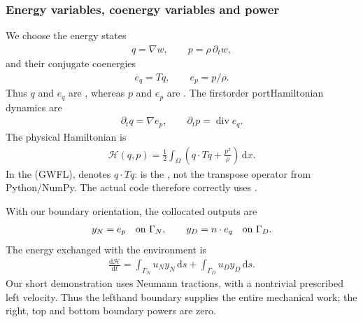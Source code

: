 \documentclass[letterpaper,10pt,english]{sphinxmanual}
\begin{document}
\subsubsection{Energy variables, co\sphinxhyphen{}energy variables and power}
\label{\detokenize{examples/wave:energy-variables-co-energy-variables-and-power}}
\sphinxAtStartPar
We choose the energy states
\begin{equation*}
\begin{split}q=\nabla w,\qquad p=\rho\,\partial_t w,\end{split}
\end{equation*}
\sphinxAtStartPar
and their conjugate co\sphinxhyphen{}energies
\begin{equation*}
\begin{split}e_q=Tq,\qquad e_p=p/\rho.\end{split}
\end{equation*}
\sphinxAtStartPar
Thus \(q\) and \(e_q\) are ,
whereas \(p\) and \(e_p\) are . The
first\sphinxhyphen{}order port\sphinxhyphen{}Hamiltonian dynamics are
\begin{equation*}
\begin{split}\partial_t q=\nabla e_p,\qquad
\partial_t p=\operatorname{div}e_q.\end{split}
\end{equation*}
\sphinxAtStartPar
The physical Hamiltonian is
\begin{equation}\label{equation:examples/wave:wave_2d_conservative_energy}
\begin{split}\mathcal H(q,p)=\tfrac12\int_{\Omega}
\left(q\cdot Tq+\frac{p^2}{\rho}\right)\,\mathrm dx.\end{split}
\end{equation}
\sphinxAtStartPar
In the  (GWFL),
 denotes \(q\cdot Tq\):  is the
, not the transpose
operator from Python/NumPy. The actual code therefore
correctly uses .

\sphinxAtStartPar
With our boundary orientation, the collocated outputs are
\begin{equation*}
\begin{split}y_N=e_p \quad\hbox{on }\Gamma_N,\qquad
y_D=n\cdot e_q \quad\hbox{on }\Gamma_D.\end{split}
\end{equation*}
\sphinxAtStartPar
The energy exchanged with the environment is
\begin{equation}\label{equation:examples/wave:wave_2d_conservative_power}
\begin{split}\frac{\mathrm d\mathcal H}{\mathrm dt}
=\int_{\Gamma_N}u_N y_N\,\mathrm ds
 +\int_{\Gamma_D}u_D y_D\,\mathrm ds.\end{split}
\end{equation}
\sphinxAtStartPar
Our short demonstration uses  Neumann tractions,
with a nontrivial prescribed left velocity. Thus the
left\sphinxhyphen{}hand boundary supplies the entire mechanical work;
the right, top and bottom boundary powers are zero.
\end{document}
